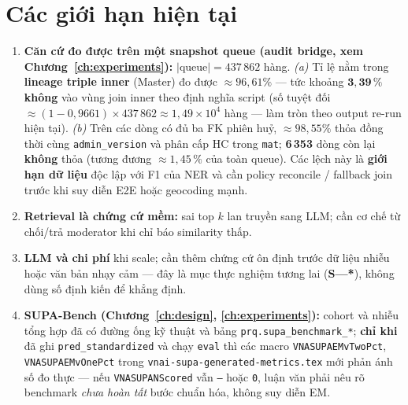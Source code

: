 \section{Các giới hạn hiện tại}
\begin{enumerate}
  \item \textbf{Căn cứ đo được trên một snapshot queue (audit bridge, xem Chương~\ref{ch:experiments}):} \(\lvert\text{queue}\rvert = 437\,862\) hàng. \emph{(a)} Tỉ lệ nằm trong \textbf{lineage triple inner} (Master) đo được \(\approx 96{,}61\%\) --- tức khoảng \(\mathbf{3{,}39\,\%}\) \textbf{không} vào vùng join inner theo định nghĩa script (số tuyệt đối \(\approx (1-0{,}9661)\times 437\,862 \approx 1{,}49\times 10^4\) hàng --- làm tròn theo output re-run hiện tại). \emph{(b)} Trên các dòng có đủ ba FK phiên huỷ, \(\approx 98{,}55\%\) thỏa đồng thời cùng \texttt{admin\_version} và phân cấp HC trong \texttt{mat}; \textbf{6\,353} dòng còn lại \textbf{không} thỏa (tương đương \(\approx 1{,}45\,\%\) của toàn queue). Các lệch này là \textbf{giới hạn dữ liệu} độc lập với F1 của NER và cần policy reconcile / fallback join trước khi suy diễn E2E hoặc geocoding mạnh.
  \item \textbf{Retrieval là chứng cứ mềm:} sai top \(k\) lan truyền sang LLM; cần cơ chế từ chối/trả moderator khi chỉ báo similarity thấp.
  \item \textbf{LLM và chi phí} khi scale; cần thêm chứng cứ ôn định trước dữ liệu nhiễu hoặc văn bản nhạy cảm --- đây là mục thực nghiệm tương lai (\textbf{S---*}), không dùng số định kiến để khẳng định.
  \item \textbf{SUPA-Bench (Chương~\ref{ch:design}, \ref{ch:experiments}):} cohort và nhiễu tổng hợp đã có đường ống kỹ thuật và bảng \texttt{prq.supa\_benchmark\_*}; \textbf{chỉ khi} đã ghi \texttt{pred\_standardized} và chạy \texttt{eval} thì các macro \texttt{VNASUPAEMvTwoPct}, \texttt{VNASUPAEMvOnePct} trong \texttt{vnai-supa-generated-metrics.tex} mới phản ánh số đo thực --- nếu \texttt{VNASUPANScored} vẫn \texttt{---} hoặc \texttt{0}, luận văn phải nêu rõ benchmark \emph{chưa hoàn tất} bước chuẩn hóa, không suy diễn EM.
\end{enumerate}


